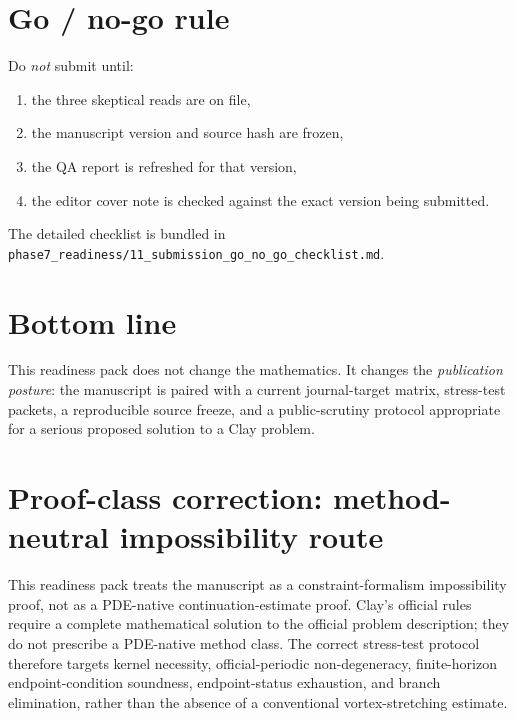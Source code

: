 \documentclass[11pt]{article}
\begin{document}
\section{Go / no-go rule}
Do \emph{not} submit until:
\begin{enumerate}[leftmargin=1.5em]
\item the three skeptical reads are on file,
\item the manuscript version and source hash are frozen,
\item the QA report is refreshed for that version,
\item the editor cover note is checked against the exact version being submitted.
\end{enumerate}
The detailed checklist is bundled in \texttt{phase7\_readiness/11\_submission\_go\_no\_go\_checklist.md}.

\section*{Bottom line}
This readiness pack does not change the mathematics. It changes the \emph{publication posture}: the manuscript is paired with a current journal-target matrix, stress-test packets, a reproducible source freeze, and a public-scrutiny protocol appropriate for a serious proposed solution to a Clay problem.


\section*{Proof-class correction: method-neutral impossibility route}
This readiness pack treats the manuscript as a constraint-formalism impossibility proof, not as a PDE-native continuation-estimate proof. Clay's official rules require a complete mathematical solution to the official problem description; they do not prescribe a PDE-native method class. The correct stress-test protocol therefore targets kernel necessity, official-periodic non-degeneracy, finite-horizon endpoint-condition soundness, endpoint-status exhaustion, and branch elimination, rather than the absence of a conventional vortex-stretching estimate.
\end{document}
